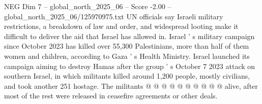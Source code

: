 \begin{textsample}{NEG Dim 7 – global\_north\_2025\_06 – Score -2.00 – global\_north\_2025\_06/125970975.txt}
UN officials say Israeli military restrictions, a breakdown of law and order, and widespread looting make it difficult to deliver the aid that Israel has allowed in.
Israel ' s military campaign since October 2023 has killed over 55,300 Palestinians, more than half of them women and children, according to Gaza ' s Health Ministry.
Israel launched its campaign aiming to destroy Hamas after the group ' s October 7 2023 attack on southern Israel, in which militants killed around 1,200 people, mostly civilians, and took another 251 hostage.
The militants @ @ @ @ @ @ @ @ @ @ alive, after most of the rest were released in ceasefire agreements or other deals.

\end{textsample}

